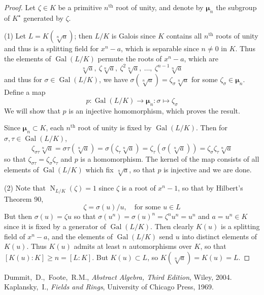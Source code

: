 \documentclass[12pt]{article}
\DeclareMathOperator{\Gal}{Gal}
\DeclareMathOperator{\N}{N}
\begin{document}
\begin{proof} Let $\zeta\in K$ be a primitive $n^{\mathrm{th}}$ root of unity, and denote by $\boldsymbol{\mu}_n$ the subgroup of $K^{\star}$ generated by $\zeta$.

(1) Let $L=K(\sqrt[n]{a})$; then $L/K$ is Galois since $K$ contains all $n^{\mathrm{th}}$ roots of unity and thus is a splitting field for $x^n-a$, which is separable since $n\neq 0$ in $K$. Thus the elements of $\Gal(L/K)$ permute the roots of $x^n-a$, which are
\[\sqrt[n]{a},\ \zeta \sqrt[n]{a},\ \zeta^2 \sqrt[n]{a},\ \dotsc,\ \zeta^{n-1}\sqrt[n]{a}\]
and thus for $\sigma\in \Gal(L/K)$, we have $\sigma(\sqrt[n]{a}) = \zeta_{\sigma} \sqrt[n]{a}$ for some $\zeta_{\sigma}\in\boldsymbol{\mu}_n$.
Define a map
\[p:\Gal(L/K)\to \boldsymbol{\mu}_n:\sigma\mapsto\zeta_{\sigma}\]
We will show that $p$ is an injective homomorphism, which proves the result.

Since $\boldsymbol{\mu}_n\subset K$, each $n^{\mathrm{th}}$ root of unity is fixed by $\Gal(L/K)$. Then for $\sigma,\tau\in\Gal(L/K)$,
\[
  \zeta_{\sigma\tau}\sqrt[n]{a} =\sigma\tau(\sqrt[n]{a}) = \sigma(\zeta_{\tau}\sqrt[n]{a}) 
                          = \zeta_{\tau}(\sigma(\sqrt[n]{a}))
                          = \zeta_{\sigma}\zeta_{\tau}\sqrt[n]{a}
\]
so that $\zeta_{\sigma\tau} = \zeta_{\sigma}\zeta_{\tau}$ and $p$ is a homomorphism. The kernel of the map consists of all elements of $\Gal(L/K)$ which fix $\sqrt[n]{a}$, so that $p$ is injective and we are done.

(2) Note that $\N_{L/K}(\zeta) = 1$ since $\zeta$ is a root of $x^n-1$, so that by Hilbert's Theorem 90, 
\[\zeta = \sigma(u)/u,\quad\text{for some }u\in L\]
But then $\sigma(u) = \zeta u$ so that $\sigma(u^n) = \sigma(u)^n = \zeta^n u^n = u^n$ and $a=u^n\in K$ since it is fixed by a generator of $\Gal(L/K)$. Then clearly $K(u)$ is a splitting field of $x^n-a$, and the elements of $\Gal(L/K)$ send $u$ into distinct elements of $K(u)$. Thus $K(u)$ admits at least $n$ automorphisms over $K$, so that $[K(u):K]\geq n = [L:K]$. But $K(u)\subset L$, so $K(\sqrt[n]{a})=K(u)=L$.
\end{proof}

\begin{thebibliography}{10}
Dummit,~D.,~Foote,~R.M., \emph{Abstract Algebra, Third Edition}, Wiley, 2004.
Kaplansky,~I., \emph{Fields and Rings}, University of Chicago Press, 1969.
\end{thebibliography}
\end{document}
